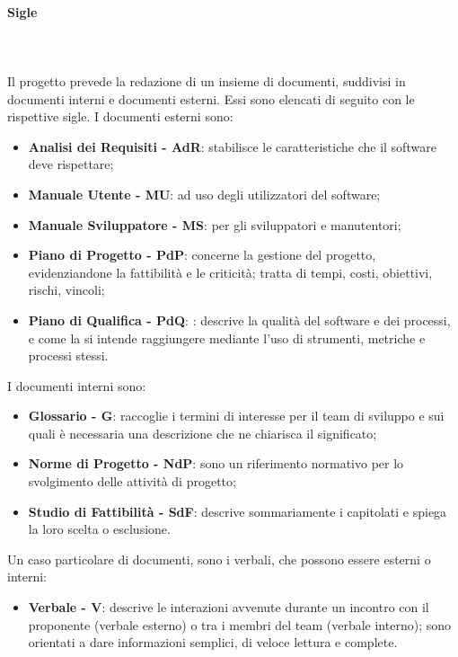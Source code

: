 		\paragraph{Sigle} \mbox{}\\ \mbox{}\\
		Il progetto prevede la redazione di un insieme di documenti, suddivisi in documenti interni e documenti esterni. Essi sono elencati di seguito con le rispettive sigle.\newline
		I documenti esterni sono:	
		\begin{itemize}
			\item \textbf{Analisi dei Requisiti - AdR}: stabilisce le caratteristiche che il software deve rispettare;
			\item \textbf{Manuale Utente - MU}: ad uso degli utilizzatori del software;
			\item \textbf{Manuale Sviluppatore - MS}: per gli sviluppatori e manutentori;
			\item \textbf{Piano di Progetto - PdP}:  concerne la gestione del progetto, evidenziandone la fattibilità e le criticità; tratta di tempi, costi, obiettivi, rischi, vincoli;
			\item \textbf{Piano di Qualifica - PdQ}: : descrive la qualità del software e dei processi, e come la si intende raggiungere mediante l'uso di strumenti, metriche e processi stessi.
		\end{itemize}
		I documenti interni sono:
		\begin{itemize}
			\item \textbf{Glossario - G}: raccoglie i termini di interesse per il team di sviluppo e sui quali è necessaria una descrizione che ne chiarisca il significato;
			\item \textbf{Norme di Progetto - NdP}: sono un riferimento normativo per lo svolgimento delle attività di progetto;
			\item \textbf{Studio di Fattibilità - SdF}: descrive sommariamente i capitolati e spiega la loro scelta o esclusione.
		\end{itemize}
		Un caso particolare di documenti, sono i verbali, che possono essere esterni o interni:
		\begin{itemize}
			\item \textbf{Verbale - V}: descrive le interazioni avvenute durante un incontro con il proponente (verbale esterno) o tra i membri del team (verbale interno); sono orientati a dare informazioni semplici, di veloce lettura e complete.
		\end{itemize}
